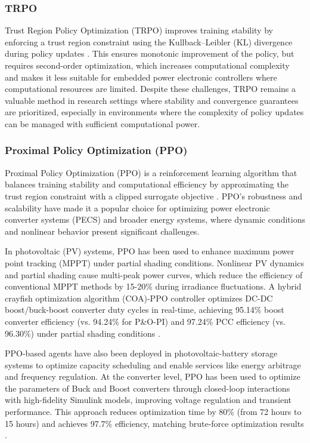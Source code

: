 \subsubsection{TRPO}

Trust Region Policy Optimization (TRPO) improves training stability by enforcing a trust region constraint using the Kullback–Leibler (KL) divergence during policy updates \cite{schulman2015trust}. This ensures monotonic improvement of the policy, but requires second-order optimization, which increases computational complexity and makes it less suitable for embedded power electronic controllers where computational resources are limited. Despite these challenges, TRPO remains a valuable method in research settings where stability and convergence guarantees are prioritized, especially in environments where the complexity of policy updates can be managed with sufficient computational power.

\subsubsection{Proximal Policy Optimization (PPO)} 

Proximal Policy Optimization (PPO) is a reinforcement learning algorithm that balances training stability and computational efficiency by approximating the trust region constraint with a clipped surrogate objective \cite{schulman2017proximal}. PPO’s robustness and scalability have made it a popular choice for optimizing power electronic converter systems (PECS) and broader energy systems, where dynamic conditions and nonlinear behavior present significant challenges.

In photovoltaic (PV) systems, PPO has been used to enhance maximum power point tracking (MPPT) under partial shading conditions. Nonlinear PV dynamics and partial shading cause multi-peak power curves, which reduce the efficiency of conventional MPPT methods by 15-20\% during irradiance fluctuations. A hybrid crayfish optimization algorithm (COA)-PPO controller optimizes DC-DC boost/buck-boost converter duty cycles in real-time, achieving 95.14\% boost converter efficiency (vs. 94.24\% for P\&O-PI) and 97.24\% PCC efficiency (vs. 96.30\%) under partial shading conditions \cite{ghazi2024maximum}.

PPO-based agents have also been deployed in photovoltaic-battery storage systems to optimize capacity scheduling and enable services like energy arbitrage and frequency regulation. At the converter level, PPO has been used to optimize the parameters of Buck and Boost converters through closed-loop interactions with high-fidelity Simulink models, improving voltage regulation and transient performance. This approach reduces optimization time by 80\% (from 72 hours to 15 hours) and achieves 97.7\% efficiency, matching brute-force optimization results \cite{bui2023deep}.

